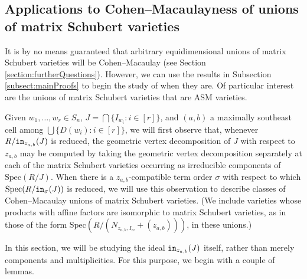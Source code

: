 \documentclass[12pt,reqno]{amsart}
\newtheorem{Main Conjecture}[theorem]{Main Conjecture}
\theoremstyle{remark}
\theoremstyle{plain}
\newcommand{\init}{{\tt in}}
\newcommand{\spec}{{\mbox{Spec}}}
\begin{document}
\subsection{Applications to Cohen--Macaulayness of unions of matrix Schubert varieties}
\label{subsect:CMApplications}
It is by no means guaranteed that arbitrary equidimensional unions of matrix Schubert varieties will be Cohen--Macaulay (see Section \ref{section:furtherQuestions}).  However, we can use the results in Subsection \ref{subsect:mainProofs} to begin the study of when they are.  Of particular interest are the unions of matrix Schubert varieties that are ASM varieties. 

Given $w_1, \ldots, w_r \in S_n$, $J = \bigcap\{I_{w_i} : i \in [r] \}$, and $(a,b)$ a maximally southeast cell among $\bigcup\{D(w_i): i \in [r]\}$, we will first observe that, whenever $R/\init_{z_{a,b}}(J)$ is reduced, the geometric vertex decomposition of $J$ with respect to $z_{a,b}$ may be computed by taking the geometric vertex decomposition separately at each of the matrix Schubert varieties occurring as irreducible components of $\spec(R/J)$.  When there is a $z_{a,b}$-compatible term order $\sigma$ with respect to which $\spec(R/\init_\sigma(J))$ is reduced, we will use this observation to describe classes of Cohen--Macaulay unions of matrix Schubert varieties. (We include varieties whose products with affine factors are isomorphic to matrix Schubert varieties, as in those of the form $\spec(R/(N_{z_{a,b},I_w}+(z_{a,b})))$, in these unions.)   

In this section, we will be studying the ideal $\init_{z_{a,b}}(J)$ itself, rather than merely components and multiplicities.  For this purpose, we begin with a couple of lemmas.
\end{document}

